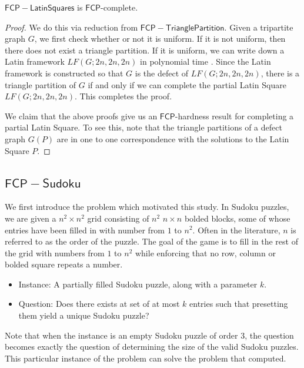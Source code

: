 \documentclass[runningheads,a4paper]{llncs}
\begin{document}
\begin{theorem}
$\mathsf{FCP-Latin Squares}$ is $\mathsf{FCP}$-complete.
\end{theorem}

\begin{proof}
We do this via reduction from $\mathsf{FCP-TrianglePartition}$. Given a tripartite graph $G$, we first check whether or not it is uniform. If it is not uniform, then there does not exist a triangle partition. If it is uniform, we can write down a Latin framework $LF(G;2n,2n,2n)$ in polynomial time \cite{colbourn1984complexity}. Since the Latin framework is constructed so that $G$ is the defect of $LF(G;2n,2n,2n)$, there is a triangle partition of $G$ if and only if we can complete the partial Latin Square $LF(G;2n,2n,2n)$. This completes the proof.

We claim that the above proofs give us an $\mathsf{FCP}$-hardness result for completing a partial Latin Square. To see this, note that the triangle partitions of a defect graph $G(P)$ are in one to one correspondence with the solutions to the Latin Square $P$.
\end{proof}

\subsection{$\mathsf{FCP-Sudoku}$}

We first introduce the problem which motivated this study. In Sudoku puzzles, we are given a $n^2 \times n^2$ grid consisting of $n^2$ $n \times n$ bolded blocks, some of whose entries have been filled in with number from $1$ to $n^2$. Often in the literature, $n$ is referred to as the order of the puzzle. The goal of the game is to fill in the rest of the grid with numbers from $1$ to $n^2$ while enforcing that no row, column or bolded square repeats a number. 

\begin{itemize}
\item Instance: A partially filled Sudoku puzzle, along with a parameter $k$.
\item Question: Does there exists at set of at most $k$ entries such that presetting them yield a unique Sudoku puzzle?
\end{itemize}

Note that when the instance is an empty Sudoku puzzle of order 3, the question becomes exactly the question of determining the size of the valid Sudoku puzzles. This particular instance of the problem can solve the problem that \cite{mcguire2012there} computed. 
\end{document}

